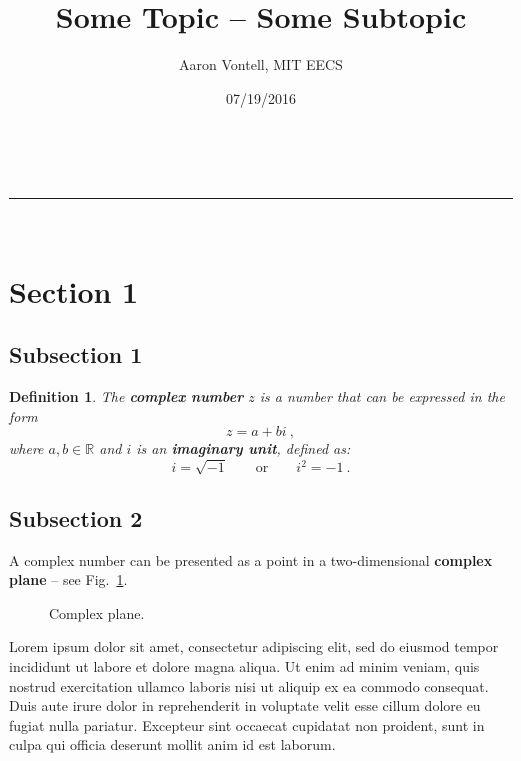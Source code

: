 \documentclass[12pt]{article}
\makeatletter
\newcommand{\linia}{\rule{\linewidth}{0.5pt}}
\theoremstyle{mytheor}
\newtheorem{defi}{Definition}
\renewcommand{\maketitle}{
\begin{center}
\vspace{2ex}
{\huge \textsc{\@title}}
\vspace{1ex}
\\
\linia\\
\@author \hfill \@date
\vspace{4ex}
\end{center}
}
\makeatother
\begin{document}
\title{Some Topic -- Some Subtopic}

\author{Aaron Vontell, MIT EECS}

\date{07/19/2016}

\maketitle

\section{Section 1}

\subsection{Subsection 1}

\begin{defi}
The \textbf{complex number} $z$ is a number that can be expressed in the form
\begin{equation}
z = a + bi\ ,
\label{r1}
\end{equation}
where $a, b \in \mathbb{R}$ and $i$ is an \textbf{imaginary unit}, defined as:
$$i=\sqrt{-1} \qquad \text{or} \qquad i^2= -1\ .$$ 
\end{defi}

\subsection{Subsection 2}

A complex number can be presented as a point in a two-dimensional \textbf{complex plane} -- see Fig.~\ref{fig:cmpl}.


\begin{figure}[!htb]
\centering
{}
\caption{\label{fig:cmpl}Complex plane.}
\end{figure}

Lorem ipsum dolor sit amet, consectetur adipiscing elit, sed do eiusmod tempor incididunt ut labore et dolore magna aliqua. Ut enim ad minim veniam, quis nostrud exercitation ullamco laboris nisi ut aliquip ex ea commodo consequat. Duis aute irure dolor in reprehenderit in voluptate velit esse cillum dolore eu fugiat nulla pariatur. Excepteur sint occaecat cupidatat non proident, sunt in culpa qui officia deserunt mollit anim id est laborum.
\end{document}
